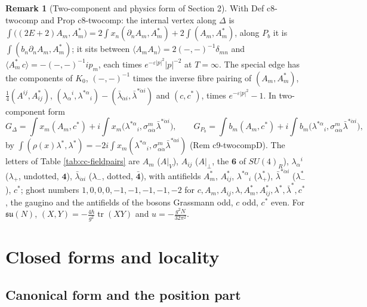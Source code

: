 \documentclass[11pt]{article}
\numberwithin{equation}{section}
\theoremstyle{plain}
\theoremstyle{definition}
\newtheorem{remark}[theorem]{Remark}
\newcommand{\Ap}{A|_{\perp}}
\newcommand{\AV}{A|_V}
\begin{document}
\begin{remark}[Two-component and physics form of Section 2]
\label{rem:cc-twocomp1}
With Def c8-twocomp and Prop c8-twocomp: the internal vertex along $\Delta$ is $\int\big((2E+2)A_m,A^*_m\big)=2\int x_n(\partial_nA_m,A^*_m)+2\int(A_m,A^*_m)$, along $P_b$ it is $\int(b_n\partial_nA_m,A^*_m)$; it sits between $\langle A_mA_n\rangle=2(-,-)^{-1}\delta_{mn}$ and $\langle A^*_m\,c\rangle=-(-,-)^{-1}ip_m$, each times $e^{-\varepsilon|p|^2}|p|^{-2}$ at $T=\infty$. The special edge has the components of $K_0$, $(-,-)^{-1}$ times the inverse fibre pairing of $(A_m,A^*_m)$, $\tfrac14(A^{ij},A^*_{ij})$, $(\lambda_\alpha{}^i,\lambda^{*\alpha}{}_i)-(\bar\lambda_{\dot\alpha i},\bar\lambda^{*\dot\alpha i})$ and $(c,c^*)$, times $e^{-\varepsilon|p|^2}-1$. In two-component form
\[
G_\Delta=\int x_m(A_m,c^*)+i\int x_m\big(\lambda^{*\alpha}{}_i,\sigma^m_{\alpha\dot\alpha}\bar\lambda^{*\dot\alpha i}\big),\qquad G_{P_b}=\int b_m(A_m,c^*)+i\int b_m\big(\lambda^{*\alpha}{}_i,\sigma^m_{\alpha\dot\alpha}\bar\lambda^{*\dot\alpha i}\big),
\]
by $\int(\rho(x)\lambda^*,\lambda^*)=-2i\int x_m(\lambda^{*\alpha}{}_i,\sigma^m_{\alpha\dot\alpha}\bar\lambda^{*\dot\alpha i})$ (Rem c9-twocompD). The letters of Table \ref{tab:cc-fieldpairs} are $A_m$ ($\AV$), $A_{ij}$ ($\Ap$, the $\mathbf 6$ of $SU(4)_R$), $\lambda_\alpha{}^i$ ($\lambda_+$, undotted, $\mathbf 4$), $\bar\lambda_{\dot\alpha i}$ ($\lambda_-$, dotted, $\bar{\mathbf 4}$), with antifields $A^*_m$, $A^*_{ij}$, $\lambda^{*\alpha}{}_i$ ($\lambda^*_+$), $\bar\lambda^{*\dot\alpha i}$ ($\lambda^*_-$), $c^*$; ghost numbers $1,0,0,0,-1,-1,-1,-1,-2$ for $c,A_m,A_{ij},\lambda,A^*_m,A^*_{ij},\lambda^*,\bar\lambda^*,c^*$, the gaugino and the antifields of the bosons Grassmann odd, $c$ odd, $c^*$ even. For $\mathfrak{su}(N)$, $(X,Y)=-\tfrac{4\hbar}{g^2}\operatorname{tr}(XY)$ and $u=-\tfrac{g^2N}{32\pi^2}$.
\end{remark}

\section{Closed forms and locality}
\label{sec:cc-closed}

\subsection{Canonical form and the position part}
\end{document}
